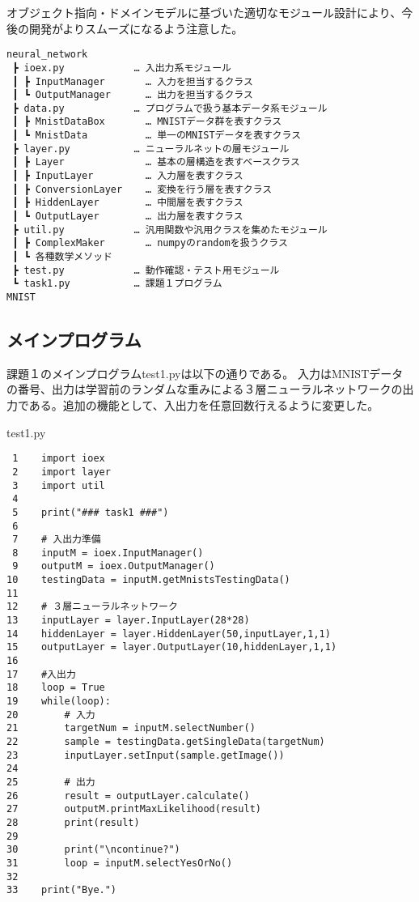 \documentclass{ujarticle} %
\begin{document}
オブジェクト指向・ドメインモデルに基づいた適切なモジュール設計により、今後の開発がよりスムーズになるよう注意した。

\begin{verbatim}
neural_network
 ┣ ioex.py            … 入出力系モジュール
 ┃ ┣ InputManager       … 入力を担当するクラス
 ┃ ┗ OutputManager      … 出力を担当するクラス
 ┣ data.py            … プログラムで扱う基本データ系モジュール
 ┃ ┣ MnistDataBox       … MNISTデータ群を表すクラス
 ┃ ┗ MnistData          … 単一のMNISTデータを表すクラス
 ┣ layer.py           … ニューラルネットの層モジュール
 ┃ ┣ Layer              … 基本の層構造を表すベースクラス
 ┃ ┣ InputLayer         … 入力層を表すクラス
 ┃ ┣ ConversionLayer    … 変換を行う層を表すクラス
 ┃ ┣ HiddenLayer        … 中間層を表すクラス
 ┃ ┗ OutputLayer        … 出力層を表すクラス
 ┣ util.py            … 汎用関数や汎用クラスを集めたモジュール
 ┃ ┣ ComplexMaker       … numpyのrandomを扱うクラス
 ┃ ┗ 各種数学メソッド
 ┣ test.py            … 動作確認・テスト用モジュール
 ┗ task1.py           … 課題１プログラム
MNIST
\end{verbatim}


\subsection{メインプログラム}

課題１のメインプログラムtest1.pyは以下の通りである。
入力はMNISTデータの番号、出力は学習前のランダムな重みによる３層ニューラルネットワークの出力である。追加の機能として、入出力を任意回数行えるように変更した。

\begin{itembox}[l]{test1.py}
  \begin{verbatim}
 1    import ioex
 2    import layer
 3    import util
 4
 5    print("### task1 ###")
 6
 7    # 入出力準備
 8    inputM = ioex.InputManager()
 9    outputM = ioex.OutputManager()
10    testingData = inputM.getMnistsTestingData()
11
12    # ３層ニューラルネットワーク
13    inputLayer = layer.InputLayer(28*28)
14    hiddenLayer = layer.HiddenLayer(50,inputLayer,1,1)
15    outputLayer = layer.OutputLayer(10,hiddenLayer,1,1)
16
17    #入出力
18    loop = True
19    while(loop):
20        # 入力
21        targetNum = inputM.selectNumber()
22        sample = testingData.getSingleData(targetNum)
23        inputLayer.setInput(sample.getImage())
24
25        # 出力
26        result = outputLayer.calculate()
27        outputM.printMaxLikelihood(result)
28        print(result)
29
30        print("\ncontinue?")
31        loop = inputM.selectYesOrNo()
32
33    print("Bye.")
  \end{verbatim}
\end{itembox}
\end{document}

